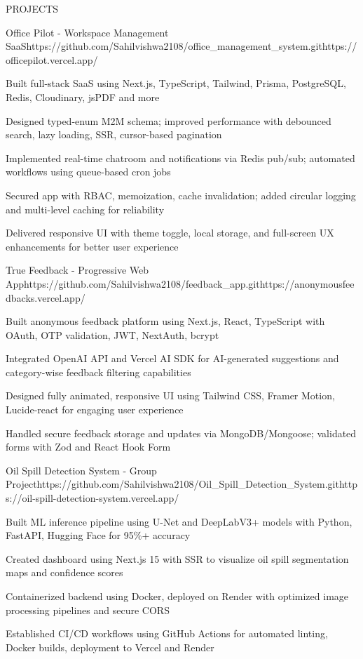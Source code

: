 \documentclass{resume}
\begin{document}
\begin{rSection}{PROJECTS}

\begin{rProject}{Office Pilot - Workspace Management SaaS}{https://github.com/Sahilvishwa2108/office_management_system.git}{https://officepilot.vercel.app/}
\item Built full-stack SaaS using Next.js, TypeScript, Tailwind, Prisma, PostgreSQL, Redis, Cloudinary, jsPDF and more
\item Designed typed-enum M2M schema; improved performance with debounced search, lazy loading, SSR, cursor-based pagination
\item Implemented real-time chatroom and notifications via Redis pub/sub; automated workflows using queue-based cron jobs
\item Secured app with RBAC, memoization, cache invalidation; added circular logging and multi-level caching for reliability
\item Delivered responsive UI with theme toggle, local storage, and full-screen UX enhancements for better user experience
\end{rProject}

\begin{rProject}{True Feedback - Progressive Web App}{https://github.com/Sahilvishwa2108/feedback_app.git}{https://anonymousfeedbacks.vercel.app/}
\item Built anonymous feedback platform using Next.js, React, TypeScript with OAuth, OTP validation, JWT, NextAuth, bcrypt
\item Integrated OpenAI API and Vercel AI SDK for AI-generated suggestions and category-wise feedback filtering capabilities
\item Designed fully animated, responsive UI using Tailwind CSS, Framer Motion, Lucide-react for engaging user experience
\item Handled secure feedback storage and updates via MongoDB/Mongoose; validated forms with Zod and React Hook Form
\end{rProject}

\begin{rProject}{Oil Spill Detection System - Group Project}{https://github.com/Sahilvishwa2108/Oil_Spill_Detection_System.git}{https://oil-spill-detection-system.vercel.app/}
\item Built ML inference pipeline using U-Net and DeepLabV3+ models with Python, FastAPI, Hugging Face for 95\%+ accuracy
\item Created dashboard using Next.js 15 with SSR to visualize oil spill segmentation maps and confidence scores
\item Containerized backend using Docker, deployed on Render with optimized image processing pipelines and secure CORS
\item Established CI/CD workflows using GitHub Actions for automated linting, Docker builds, deployment to Vercel and Render
\end{rProject}

\end{rSection}
\end{document}
